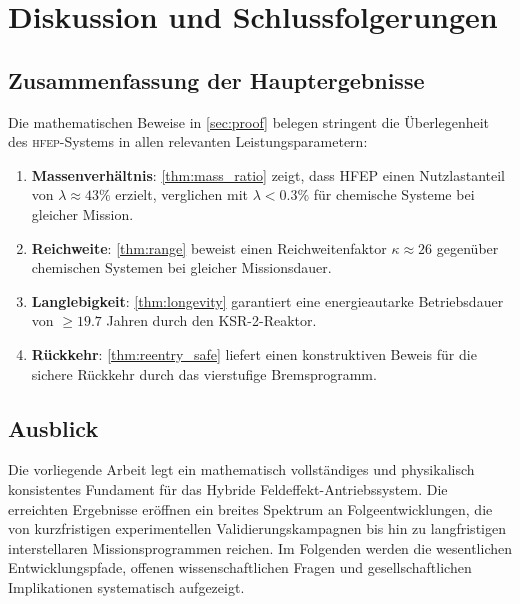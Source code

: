 ﻿\documentclass[a4paper,12pt,twoside]{article}
\theoremstyle{plain}
\theoremstyle{definition}
\theoremstyle{remark}
\newcommand{\HFEP}{\textsc{hfep}}
\begin{document}
	\section{Diskussion und Schlussfolgerungen}
	\label{sec:discussion}
	
	\subsection{Zusammenfassung der Hauptergebnisse}
	
	Die mathematischen Beweise in \cref{sec:proof} belegen stringent die Überlegenheit
	des \HFEP-Systems in allen relevanten Leistungsparametern:
	
	\begin{enumerate}
		\item \textbf{Massenverhältnis}: \cref{thm:mass_ratio} zeigt, dass HFEP einen
		Nutzlastanteil von $\lambda \approx 43\%$ erzielt, verglichen mit
		$\lambda < 0.3\%$ für chemische Systeme bei gleicher Mission.
		
		\item \textbf{Reichweite}: \cref{thm:range} beweist einen Reichweitenfaktor
		$\kappa \approx 26$ gegenüber chemischen Systemen bei gleicher Missionsdauer.
		
		\item \textbf{Langlebigkeit}: \cref{thm:longevity} garantiert eine
		energieautarke Betriebsdauer von $\geq 19.7$ Jahren durch den KSR-2-Reaktor.
		
		\item \textbf{Rückkehr}: \cref{thm:reentry_safe} liefert einen konstruktiven
		Beweis für die sichere Rückkehr durch das vierstufige Bremsprogramm.
	\end{enumerate}
	
	\subsection{Ausblick}
	\label{sec:ausblick}

	Die vorliegende Arbeit legt ein mathematisch vollständiges und physikalisch
	konsistentes Fundament für das Hybride Feldeffekt-Antriebssystem. Die erreichten
	Ergebnisse eröffnen ein breites Spektrum an Folgeentwicklungen, die von
	kurzfristigen experimentellen Validierungskampagnen bis hin zu langfristigen
	interstellaren Missionsprogrammen reichen. Im Folgenden werden die wesentlichen
	Entwicklungspfade, offenen wissenschaftlichen Fragen und gesellschaftlichen
	Implikationen systematisch aufgezeigt.
\end{document}
